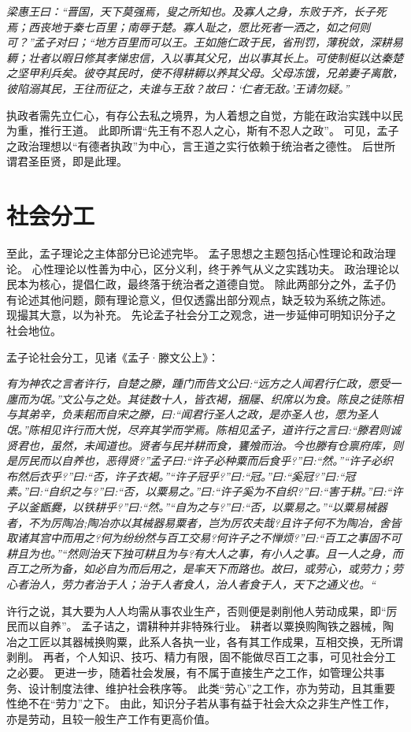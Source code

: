 \documentclass[11pt]{article}
\begin{document}
\textit{梁惠王曰：“晋国，天下莫强焉，叟之所知也。及寡人之身，东败于齐，长子死焉；西丧地于秦七百里；南辱于楚。寡人耻之，愿比死者一洒之，如之何则可？”孟子对曰；“地方百里而可以王。王如施仁政于民，省刑罚，薄税敛，深耕易耨；壮者以暇日修其孝悌忠信，入以事其父兄，出以事其长上。可使制梃以达秦楚之坚甲利兵矣。彼夺其民时，使不得耕耨以养其父母。父母冻饿，兄弟妻子离散，彼陷溺其民，王往而征之，夫谁与王敌？故曰：‘仁者无敌。’王请勿疑。”}

执政者需先立仁心，有存公去私之境界，为人着想之自觉，方能在政治实践中以民为重，推行王道。
此即所谓“先王有不忍人之心，斯有不忍人之政”。
可见，孟子之政治理想以“有德者执政”为中心，言王道之实行依赖于统治者之德性。
后世所谓君圣臣贤，即是此理。
  
\section{社会分工}
至此，孟子理论之主体部分已论述完毕。
孟子思想之主题包括心性理论和政治理论。
心性理论以性善为中心，区分义利，终于养气从义之实践功夫。
政治理论以民本为核心，提倡仁政，最终落于统治者之道德自觉。
除此两部分之外，孟子仍有论述其他问题，颇有理论意义，但仅透露出部分观点，缺乏较为系统之陈述。
现撮其大意，以为补充。
先论孟子社会分工之观念，进一步延伸可明知识分子之社会地位。

\par

孟子论社会分工，见诸《孟子·滕文公上》：

\textit{有为神农之言者许行，自楚之滕，踵门而告文公曰:“远方之人闻君行仁政，愿受一廛而为氓。”文公与之处。其徒数十人，皆衣褐，捆屦、织席以为食。陈良之徒陈相与其弟辛，负耒耜而自宋之滕，曰:“闻君行圣人之政，是亦圣人也，愿为圣人氓。”陈相见许行而大悦，尽弃其学而学焉。陈相见孟子，道许行之言曰:“滕君则诚贤君也，虽然，未闻道也。贤者与民并耕而食，饔飧而治。今也滕有仓禀府库，则是厉民而以自养也，恶得贤?”孟子曰:“许子必种粟而后食乎?”曰:“然。”“许子必织布然后衣乎?”曰:“否，许子衣褐。”“许子冠乎?”曰:“冠。”曰:“奚冠?”曰:“冠素。”曰:“自织之与?”曰:“否，以粟易之。”曰:“许子奚为不自织?”曰:“害于耕。”曰:“许子以釜甑爨，以铁耕乎?”曰:“然。”“自为之与?”曰:“否，以粟易之。”“以粟易械器者，不为厉陶冶;陶冶亦以其械器易粟者，岂为厉农夫哉?且许子何不为陶冶，舍皆取诸其宫中而用之?何为纷纷然与百工交易?何许子之不惮烦?”曰:“百工之事固不可耕且为也。”“然则治天下独可耕且为与?有大人之事，有小人之事。且一人之身，而百工之所为备，如必自为而后用之，是率天下而路也。故曰，或劳心，或劳力；劳心者治人，劳力者治于人；治于人者食人，治人者食于人，天下之通义也。“}

许行之说，其大要为人人均需从事农业生产，否则便是剥削他人劳动成果，即“厉民而以自养”。
孟子诘之，谓耕种并非特殊行业。
耕者以粟换购陶铁之器械，陶冶之工匠以其器械换购粟，此系人各执一业，各有其工作成果，互相交换，无所谓剥削。
再者，个人知识、技巧、精力有限，固不能做尽百工之事，可见社会分工之必要。
更进一步，随着社会发展，有不属于直接生产之工作，如管理公共事务、设计制度法律、维护社会秩序等。
此类“劳心”之工作，亦为劳动，且其重要性绝不在“劳力”之下。
由此，知识分子若从事有益于社会大众之非生产性工作，亦是劳动，且较一般生产工作有更高价值。
  
\end{document}
